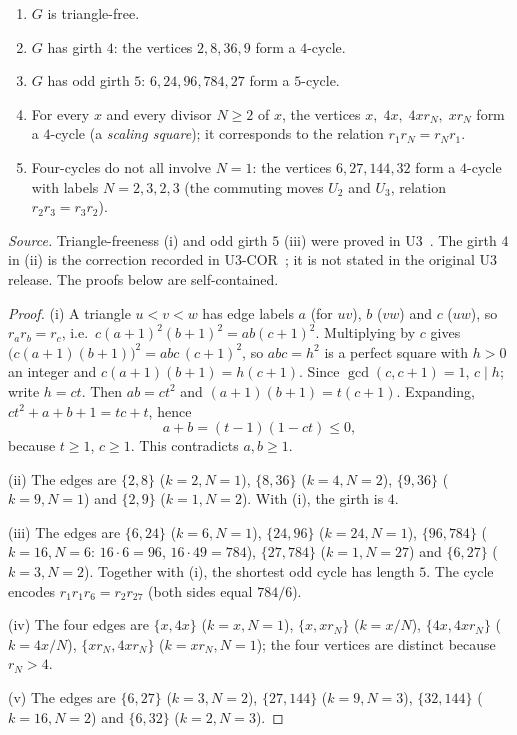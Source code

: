 \begin{theorem}\label{thm:cycles}
\begin{enumerate}[label=(\roman*),itemsep=1pt]
\item $G$ is triangle-free.
\item $G$ has girth $4$: the vertices $2,8,36,9$ form a $4$-cycle.
\item $G$ has odd girth $5$: $6,24,96,784,27$ form a $5$-cycle.
\item For every $x$ and every divisor $N\ge2$ of $x$, the vertices $x,\;4x,\;4xr_N,\;xr_N$ form a $4$-cycle (a \emph{scaling square}); it corresponds to the relation $r_1r_N=r_Nr_1$.
\item Four-cycles do not all involve $N=1$: the vertices $6,27,144,32$ form a $4$-cycle with labels $N=2,3,2,3$ (the commuting moves $U_2$ and $U_3$, relation $r_2r_3=r_3r_2$).
\end{enumerate}
\end{theorem}
\noindent\emph{Source.} Triangle-freeness (i) and odd girth $5$ (iii) were proved in U3~\cite{UTHREE}. The girth $4$ in (ii) is the correction recorded in U3-COR~\cite{UCOR}; it is not stated in the original U3 release. The proofs below are self-contained.
\begin{proof}
(i) A triangle $u<v<w$ has edge labels $a$ (for $uv$), $b$ ($vw$) and $c$ ($uw$), so $r_ar_b=r_c$, i.e.\ $c(a+1)^2(b+1)^2=ab(c+1)^2$. Multiplying by $c$ gives $\bigl(c(a+1)(b+1)\bigr)^2=abc\,(c+1)^2$, so $abc=h^2$ is a perfect square with $h>0$ an integer and $c(a+1)(b+1)=h(c+1)$. Since $\gcd(c,c+1)=1$, $c\mid h$; write $h=ct$. Then $ab=ct^2$ and $(a+1)(b+1)=t(c+1)$. Expanding, $ct^2+a+b+1=tc+t$, hence
\[
a+b=(t-1)(1-ct)\le0,
\]
because $t\ge1$, $c\ge1$. This contradicts $a,b\ge1$.

(ii) The edges are $\{2,8\}$ ($k=2,N=1$), $\{8,36\}$ ($k=4,N=2$), $\{9,36\}$ ($k=9,N=1$) and $\{2,9\}$ ($k=1,N=2$). With (i), the girth is $4$.

(iii) The edges are $\{6,24\}$ ($k=6,N=1$), $\{24,96\}$ ($k=24,N=1$), $\{96,784\}$ ($k=16,N=6$: $16\cdot6=96$, $16\cdot49=784$), $\{27,784\}$ ($k=1,N=27$) and $\{6,27\}$ ($k=3,N=2$). Together with (i), the shortest odd cycle has length $5$. The cycle encodes $r_1r_1r_6=r_2r_{27}$ (both sides equal $784/6$).

(iv) The four edges are $\{x,4x\}$ ($k=x,N=1$), $\{x,xr_N\}$ ($k=x/N$), $\{4x,4xr_N\}$ ($k=4x/N$), $\{xr_N,4xr_N\}$ ($k=xr_N,N=1$); the four vertices are distinct because $r_N>4$.

(v) The edges are $\{6,27\}$ ($k=3,N=2$), $\{27,144\}$ ($k=9,N=3$), $\{32,144\}$ ($k=16,N=2$) and $\{6,32\}$ ($k=2,N=3$). \qedhere
\end{proof}


